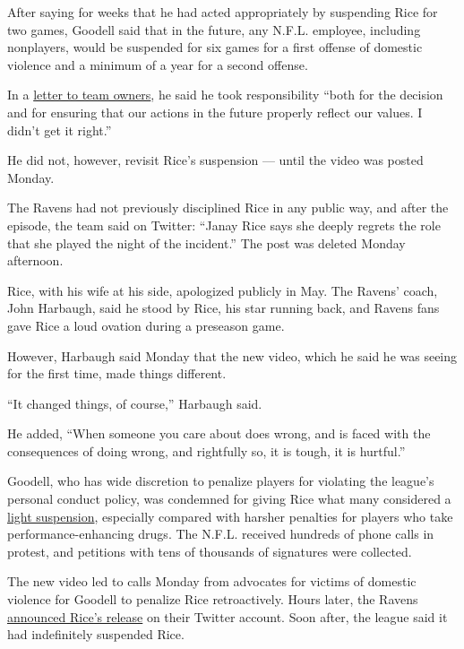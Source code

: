 After saying for weeks that he had acted appropriately by suspending
Rice for two games, Goodell said that in the future, any N.F.L.
employee, including nonplayers, would be suspended for six games for a
first offense of domestic violence and a minimum of a year for a second
offense.

In a
\href{http://graphics8.nytimes3xbfgragh.onion/packages/pdf/sports/Roger_Goodell_NFL/Roger_Goodell_letter.pdf}{letter
to team owners}, he said he took responsibility ``both for the decision
and for ensuring that our actions in the future properly reflect our
values. I didn't get it right.''

He did not, however, revisit Rice's suspension --- until the video was
posted Monday.

The Ravens had not previously disciplined Rice in any public way, and
after the episode, the team said on Twitter: ``Janay Rice says she
deeply regrets the role that she played the night of the incident.'' The
post was deleted Monday afternoon.

Rice, with his wife at his side, apologized publicly in May. The Ravens'
coach, John Harbaugh, said he stood by Rice, his star running back, and
Ravens fans gave Rice a loud ovation during a preseason game.

However, Harbaugh said Monday that the new video, which he said he was
seeing for the first time, made things different.

``It changed things, of course,'' Harbaugh said.

He added, ``When someone you care about does wrong, and is faced with
the consequences of doing wrong, and rightfully so, it is tough, it is
hurtful.''

Goodell, who has wide discretion to penalize players for violating the
league's personal conduct policy, was condemned for giving Rice what
many considered a
\href{http://www.nytimes3xbfgragh.onion/2014/08/02/sports/football/roger-goodell-defends-his-two-game-suspension-of-ray-rice.html}{light
suspension}, especially compared with harsher penalties for players who
take performance-enhancing drugs. The N.F.L. received hundreds of phone
calls in protest, and petitions with tens of thousands of signatures
were collected.

The new video led to calls Monday from advocates for victims of domestic
violence for Goodell to penalize Rice retroactively. Hours later, the
Ravens
\href{https://twitter.com/Ravens/status/509043216977371136}{announced
Rice's release} on their Twitter account. Soon after, the league said it
had indefinitely suspended Rice.

